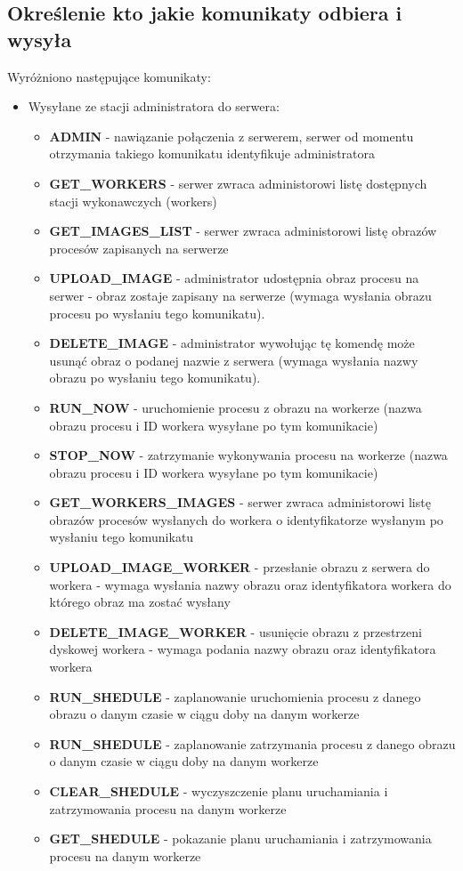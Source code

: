 \documentclass[paper=a4, fontsize=11pt]{scrartcl} %
\begin{document}
\subsection*{Określenie kto jakie komunikaty odbiera i wysyła}
Wyróżniono następujące komunikaty:
\begin{itemize}
\item Wysyłane ze stacji administratora do serwera:
	\begin{itemize}
    \item \textbf{ADMIN} - nawiązanie połączenia z serwerem, serwer od momentu otrzymania takiego komunikatu identyfikuje administratora
    \item \textbf{GET\_WORKERS} - serwer zwraca administorowi listę dostępnych stacji wykonawczych (workers)
    \item \textbf{GET\_IMAGES\_LIST} - serwer zwraca administorowi listę obrazów procesów zapisanych na serwerze
    \item \textbf{UPLOAD\_IMAGE} - administrator udostępnia obraz procesu na serwer - obraz zostaje zapisany na serwerze (wymaga wysłania obrazu procesu po wysłaniu tego komunikatu).
    \item \textbf{DELETE\_IMAGE} - administrator wywołując tę komendę może usunąć obraz o podanej nazwie z serwera (wymaga wysłania nazwy obrazu po wysłaniu tego komunikatu).
    \item \textbf{RUN\_NOW} - uruchomienie procesu z obrazu na workerze (nazwa obrazu procesu i ID workera wysyłane po tym komunikacie)
    \item \textbf{STOP\_NOW} - zatrzymanie wykonywania procesu na workerze (nazwa obrazu procesu i ID workera wysyłane po tym komunikacie)
    \item \textbf{GET\_WORKERS\_IMAGES} - serwer zwraca administorowi listę obrazów procesów wysłanych do workera o identyfikatorze wysłanym po wysłaniu tego komunikatu
    \item \textbf{UPLOAD\_IMAGE\_WORKER} - przesłanie obrazu z serwera do workera - wymaga wysłania nazwy obrazu oraz identyfikatora workera do którego obraz ma zostać wysłany
    \item \textbf{DELETE\_IMAGE\_WORKER} - usunięcie obrazu z przestrzeni dyskowej workera - wymaga podania nazwy obrazu oraz identyfikatora workera
    \item \textbf{RUN\_SHEDULE} - zaplanowanie uruchomienia procesu z danego obrazu o danym czasie w ciągu doby na danym workerze
	\item \textbf{RUN\_SHEDULE} - zaplanowanie zatrzymania procesu z danego obrazu o danym czasie w ciągu doby na danym workerze
	\item \textbf{CLEAR\_SHEDULE} - wyczyszczenie planu uruchamiania i zatrzymowania procesu na danym workerze
	\item \textbf{GET\_SHEDULE} - pokazanie planu uruchamiania i zatrzymowania procesu na danym workerze


\end{itemize}
\end{itemize}
\end{document}
